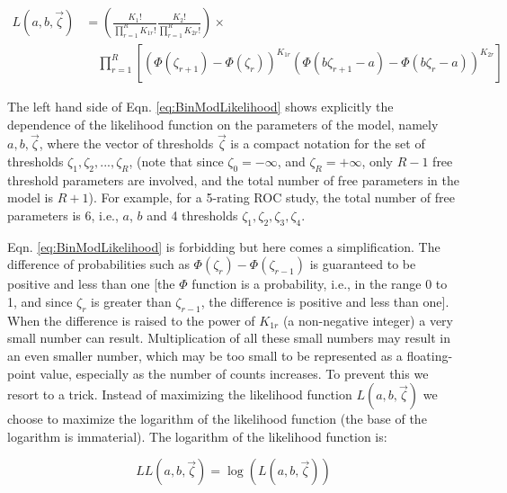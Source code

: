 \documentclass[
]{book}
\begin{document}
\begin{equation} 
\begin{split}
L\left ( a,b,\overrightarrow{\zeta} \right ) &= \left (\frac{K_1!}{\prod_{r=1}^{R}K_{1r}!}\frac{K_2!}{\prod_{r=1}^{R}K_{2r}!}  \right ) \times \\
&\quad\prod_{r=1}^{R}\left [\left (\Phi\left ( \zeta_{r+1}  \right ) - \Phi\left ( \zeta_r  \right )  \right )^{K_{1r}} \left (\Phi\left ( b\zeta_{r+1}-a  \right ) - \Phi\left ( b\zeta_r-a  \right )  \right )^{K_{2r}}  \right ]
\end{split}
\label{eq:BinModLikelihood}
\end{equation}

The left hand side of Eqn. \eqref{eq:BinModLikelihood} shows explicitly the dependence of the likelihood function on the parameters of the model, namely \(a,b,\overrightarrow{\zeta}\), where the vector of thresholds \(\overrightarrow{\zeta}\) is a compact notation for the set of thresholds \(\zeta_1,\zeta_2,...,\zeta_R\), (note that since \(\zeta_0 = -\infty\), and \(\zeta_R = +\infty\), only \(R-1\) free threshold parameters are involved, and the total number of free parameters in the model is \(R+1\)). For example, for a 5-rating ROC study, the total number of free parameters is 6, i.e., \(a\), \(b\) and 4 thresholds \(\zeta_1,\zeta_2,\zeta_3,\zeta_4\).

Eqn. \eqref{eq:BinModLikelihood} is forbidding but here comes a simplification. The difference of probabilities such as \(\Phi\left ( \zeta_r \right )-\Phi\left ( \zeta_{r-1} \right )\) is guaranteed to be positive and less than one {[}the \(\Phi\) function is a probability, i.e., in the range 0 to 1, and since \(\zeta_r\) is greater than \(\zeta_{r-1}\), the difference is positive and less than one{]}. When the difference is raised to the power of \(K_{1r}\) (a non-negative integer) a very small number can result. Multiplication of all these small numbers may result in an even smaller number, which may be too small to be represented as a floating-point value, especially as the number of counts increases. To prevent this we resort to a trick. Instead of maximizing the likelihood function \(L\left ( a,b,\overrightarrow{\zeta} \right )\) we choose to maximize the logarithm of the likelihood function (the base of the logarithm is immaterial). The logarithm of the likelihood function is:

\begin{equation} 
LL\left ( a,b,\overrightarrow{\zeta} \right )=\log \left ( L\left ( a,b,\overrightarrow{\zeta} \right ) \right )
\label{eq:BinModLogLikelihood}
\end{equation}
\end{document}

